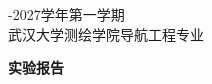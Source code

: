 \thispagestyle{empty}


\begin{center}
	{\fontsize{20pt}{20pt}-2027学年第一学期\\武汉大学测绘学院导航工程专业} \\[3cm]   %
\end{center}

\begin{center}
	{\Large \fontsize{24pt}{30pt}\selectfont \textbf{实验报告}} \\[3cm]  %
\end{center}

	
